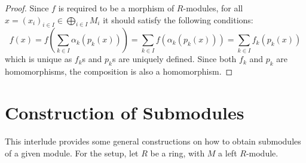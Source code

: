 \documentclass{article}
\begin{document}
\begin{proof}
    Since $f$ is required to be a morphism of $R$-modules, for all $x = (x_i)_{i\in I} \in \bigoplus_{i\in I} M_i$ it should satisfy the following conditions:
    \[
        f(x) = f\left( \sum\limits_{k\in I} \alpha_k(p_k(x)) \right) = \sum\limits_{k\in I} f(\alpha_k(p_k(x))) = \sum\limits_{k\in I} f_k(p_k(x))
    \]
    which is unique as $f_k$s and $p_k$s are uniquely defined. Since both $f_k$ and $p_k$ are homomorphisms, the composition is also a homomorphism.
\end{proof}

\section{Construction of Submodules}

This interlude provides some general constructions on how to obtain submodules of a given module. For the setup, let $R$ be a ring, with $M$ a left $R$-module.
\end{document}
